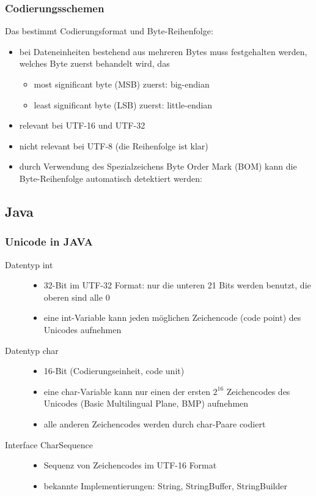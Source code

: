 \documentclass[a4paper,10pt]{article}
\begin{document}
\subsubsection{Codierungsschemen}
Das bestimmt Codierungsformat und Byte-Reihenfolge:
\begin{itemize}
	\item bei Dateneinheiten bestehend aus mehreren Bytes muss festgehalten werden, welches Byte zuerst behandelt wird, das
		\begin{itemize}
			\item most significant byte (MSB) zuerst: big-endian
			\item least significant byte (LSB) zuerst: little-endian
 		\end{itemize}		 
 	\item relevant bei UTF-16 und UTF-32
 	\item nicht relevant bei UTF-8 (die Reihenfolge ist klar)
 	\item durch Verwendung des Spezialzeichens Byte Order Mark (BOM) kann die Byte-Reihenfolge automatisch detektiert werden:
\end{itemize}

\subsection{Java}
\subsubsection{Unicode in JAVA}
\begin{description}
	\item[Datentyp int] \hfill 
		\begin{itemize}
			\item 32-Bit im UTF-32 Format: nur die unteren 21 Bits werden benutzt, die oberen sind alle 0
			\item eine int-Variable kann jeden m\"oglichen Zeichencode (code point) des Unicodes aufnehmen
		\end{itemize}
	\item[Datentyp char] \hfill 
		\begin{itemize}
			\item 16-Bit (Codierungseinheit, code unit)
			\item eine char-Variable kann nur einen der ersten $2^{16}$ Zeichencodes des Unicodes (Basic Multilingual Plane, BMP) aufnehmen
			\item alle anderen Zeichencodes werden durch char-Paare codiert
		\end{itemize}
	\item[Interface CharSequence] \hfill 
		\begin{itemize}
			\item Sequenz von Zeichencodes im UTF-16 Format
			\item bekannte Implementierungen: String, StringBuffer, StringBuilder
		\end{itemize}
\end{description}
\end{document}
